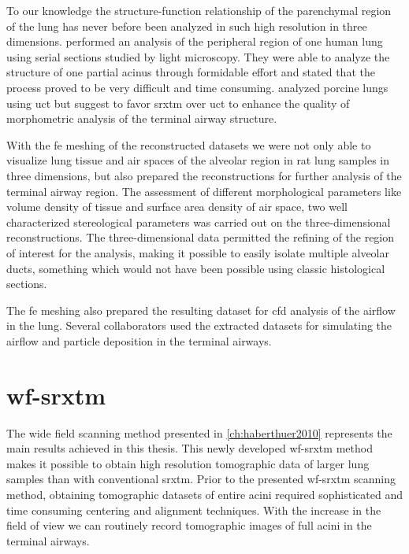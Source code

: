 To our knowledge the structure-function relationship of the pa\-ren\-chy\-mal region of the lung has never before been analyzed in such high resolution in three dimensions. \citet{Berend1991} performed an analysis of the peripheral region of one human lung using serial sections studied by light microscopy. They were able to analyze the structure of one partial acinus through formidable effort and stated that the process proved to be very difficult and time consuming. \citet{Litzlbauer2006} analyzed porcine lungs using \ac{uct} but suggest to favor \ac{srxtm} over \ac{uct} to enhance the quality of morphometric analysis of the terminal airway structure.

With the \ac{fe} meshing of the reconstructed datasets we were not only able to visualize lung tissue and air spaces of the alveolar region in rat lung samples in three dimensions, but also prepared the reconstructions for further analysis of the terminal airway region. The assessment of different morphological parameters like volume density of tissue and surface area density of air space, two well characterized stereological parameters was carried out on the three-dimensional reconstructions. The three-dimensional data permitted the refining of the region of interest for the analysis, making it possible to easily isolate multiple alveolar ducts, something which would not have been possible using classic histological sections.

The \ac{fe} meshing also prepared the resulting dataset for \ac{cfd} analysis of the airflow in the lung. Several collaborators used the extracted datasets for simulating the airflow \cite{Sznitman2007,Sznitman2009} and particle deposition \cite{Filipovic2010} in the terminal airways.

\section[\acs{wf-srxtm}]{\acl{wf-srxtm}}
The wide field scanning method presented in \autoref{ch:haberthuer2010} represents the main results achieved in this thesis. This newly developed \ac{wf-srxtm} method makes it possible to obtain high resolution tomographic data of larger lung samples than with conventional \ac{srxtm}. Prior to the presented \ac{wf-srxtm} scanning method, obtaining tomographic datasets of entire acini required sophisticated and time consuming centering and alignment techniques. With the increase in the field of view we can routinely record tomographic images of full acini in the terminal airways.

